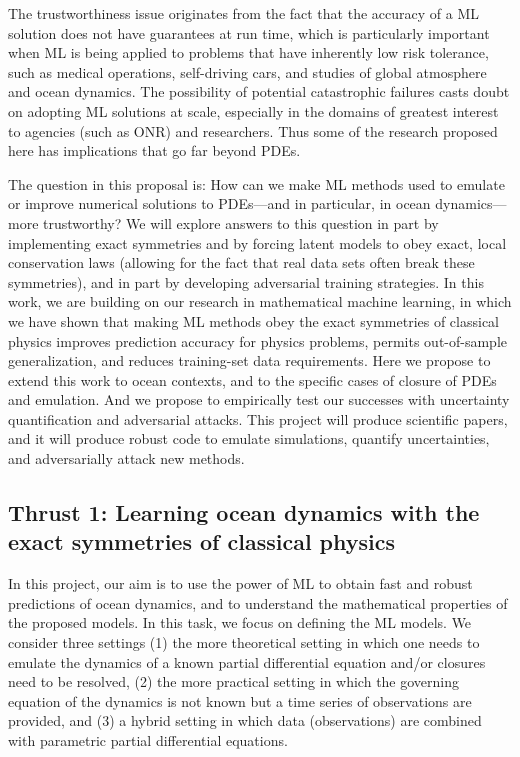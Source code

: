 \documentclass[11pt]{article}
\begin{document}
The trustworthiness issue originates from the fact that the accuracy of a ML solution does not have guarantees at run time, which is particularly important when ML is being applied to problems that have inherently low risk tolerance, such as medical operations, self-driving cars, and studies of global atmosphere and ocean dynamics. 
The possibility of potential catastrophic failures casts doubt on adopting ML solutions at scale, especially in the domains of greatest interest to agencies (such as ONR) and researchers.
Thus some of the research proposed here has implications that go far beyond PDEs.

The question in this proposal is:
How can we make ML methods used to emulate or improve numerical solutions to PDEs---and in particular, in ocean dynamics---more trustworthy?
We will explore answers to this question in part by implementing exact symmetries and by forcing latent models to obey exact, local conservation laws (allowing for the fact that real data sets often break these symmetries), and in part by developing adversarial training strategies.
In this work, we are building on our research in mathematical machine learning, in which we have shown that making ML methods obey the exact symmetries of classical physics improves prediction accuracy for physics problems, permits out-of-sample generalization, and reduces training-set data requirements.
Here we propose to extend this work to ocean contexts, and to the specific cases of closure of PDEs and emulation.
And we propose to empirically test our successes with uncertainty quantification and adversarial attacks.
This project will produce scientific papers, and it will produce robust code to emulate simulations, quantify uncertainties, and adversarially attack new methods.

\subsection{Thrust 1: Learning ocean dynamics with the exact symmetries of classical physics}

In this project, our aim is to use the power of ML to obtain fast and robust predictions of ocean dynamics, and to understand the mathematical properties of the proposed models. In this task, we focus on defining the ML models. We consider three settings (1) the more theoretical setting in which one needs to emulate the dynamics of a known partial differential equation and/or closures need to be resolved, (2) the more practical setting in which the governing equation of the dynamics is not known but a time series of observations are provided, and (3) a hybrid setting in which data (observations) are combined with parametric partial differential equations.
\end{document}
